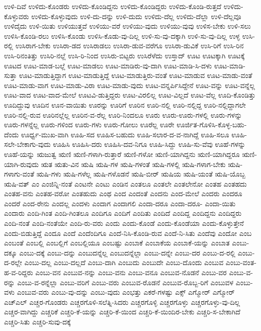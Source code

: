 {ಉಳಿ-ದಿವೆ
ಉಳಿದು-ಕೊಂಡರು
ಉಳಿದು-ಕೊಂಡಿದ್ದನು
ಉಳಿದು-ಕೊಂಡಿದ್ದರು
ಉಳಿದು-ಕೊಂಡಿ-ರುತ್ತದೆ
ಉಳಿದು-ಕೊಳ್ಳುವರು
ಉಳಿದು-ಕೊಳ್ಳುವುದು
ಉಳಿ-ದು-ದನ್ನು
ಉಳಿ-ದುದು
ಉಳಿದು-ದೆಲ್ಲ
ಉಳಿದು-ದೆಲ್ಲಾ
ಉಳಿ-ದೆಲ್ಲವೂ
ಉಳಿದೈದು
ಉಳಿ-ಯಿತು
ಉಳಿಯುತ್ತವೆ
ಉಳಿಯು-ವರೆ
ಉಳಿಯು-ವುದು
ಉಳಿಯು-ವುವು
ಉಳಿಸ-ಬೇಕು
ಉಳಿ-ಸಲು
ಉಳಿಸಿ-ಕೊಂಡಿ-ರಲು
ಉಳಿಸಿ-ಕೊಂಡು
ಉಳಿಸಿ-ಕೊಡು-ವು-ದಿಲ್ಲ
ಉಳಿ-ಸು-ವು-ದಕ್ಕಾಗಿ
ಉಳಿ-ಸು-ವು-ದಿಲ್ಲ
ಉಳ್ಳ
ಉಸಿ-ರಲ್ಲಿ
ಉಸಿರಾಗ-ಬೇಕು
ಉಸಿರಾ-ಡದ
ಉಸಿರಾಡಲು
ಉಸಿರಾ-ಡುವ-ವರೆಗೂ
ಉಸಿರಾ-ಡುವಿಕೆ
ಉಸಿ-ರಿಗೆ
ಉಸಿ-ರಿನ
ಉಸಿ-ರಿನಂತಿತ್ತು
ಉಸಿರಿ-ನಲ್ಲೆ
ಉಸಿ-ರಿ-ನಿಂದ
ಉಸಿರು-ಬಿಟ್ಟರು
ಉಸಿರೆಳೆದು
ಉಸ್ತಾದ್
ಊಟ
ಊಟಕ್ಕಾಗಿ
ಊಟಕ್ಕೆ
ಊಟದ
ಊಟ-ಮಾಡ-ಬಲ್ಲೆ
ಊಟ-ಮಾಡಲು
ಊಟ-ಮಾಡಿರು-ವು-ದಾಗಿ
ಊಟ-ಮಾಡಿ-ಸಿ-ದಳು
ಊಟ-ಮಾಡಿ-ಸುತ್ತಾ
ಊಟ-ಮಾಡುತ್ತಿದ್ದಾಗ
ಊಟ-ಮಾಡುತ್ತಿದ್ದೆ
ಊಟ-ಮಾಡುತ್ತಿರು-ವಂತೆ
ಊಟ-ಮಾಡುವ
ಊಟ-ಮಾಡು-ವಂತೆ
ಊಟ-ಮಾಡು-ವಾಗ
ಊಟ-ಮಾಡು-ವಿರಾ
ಊಟ-ಮಾಡು-ವುದು
ಊಟ-ವನ್ನರ್ಪಿಸಿದ್ದೇನೆ
ಊಟ-ವನ್ನು
ಊಟ-ವನ್ನೆಲ್ಲ
ಊಟ-ವಾದ
ಊಟ-ವಾದ-ಮೇಲೆ
ಊಟವಿ-ಡುತ್ತಿದ್ದರು
ಊಟ-ವಿರಲಿಲ್ಲ
ಊಟ-ವಿಲ್ಲದೆ
ಊಟ-ವೆಲ್ಲ
ಊದಿ-ಕೊಂಡಿತ್ತು
ಊದಿದ್ದುವು
ಊದಿನ
ಊನ-ವಾಯಿತು
ಊರನ್ನು
ಊರಿಗೆ
ಊರಿನ
ಊರಿ-ನಲ್ಲಿ
ಊರಿ-ನಲ್ಲಿದ್ದ
ಊರಿ-ನಲ್ಲಿದ್ದಾಗಲೇ
ಊರಿ-ನಲ್ಲಿ-ರುವ
ಊರಿನಲ್ಲೆಲ್ಲ
ಊರಿನ-ವ-ರೆಲ್ಲ
ಊರಿ-ನಿಂದಲೂ
ಊರು
ಊರು-ಊರು-ಗಳಲ್ಲಿ
ಊರು-ಗಳನ್ನು
ಊರು-ಗಳನ್ನೆಲ್ಲ
ಊರು-ಗಳಿಂದ
ಊರು-ಗಳು
ಊರು-ಗೋಲು
ಊರೆಲ್ಲ
ಊರೇ
ಊರ್ಜಿತ-ಗೊಳಿಸಿ-ಕೊಳ್ಳ-ಬಹು-ದೆಂದು
ಊರ್ಧ್ವ-ಮುಖ-ವಾಗಿ
ಊಹಿ-ಸದ
ಊಹಿಸ-ಬಹುದು
ಊಹಿ-ಸಲಾರ-ದ-ವ-ನಾಗಿದ್ದೆ
ಊಹಿ-ಸಲೂ
ಊಹಿ-ಸಲೇ-ಬೇಕಾಗು-ವುದು
ಊಹಿಸಿ
ಊಹಿಸಿ-ದರು
ಊಹಿಸಿ-ದವ-ನಿಗೂ
ಊಹಿ-ಸಿದ್ದು
ಊಹಿ-ಸು-ವೆವು
ಊಹೆ-ಗಳನ್ನು
ಊಹೆ-ಯನ್ನು
ಋಜುತ್ವ
ಋಣಿ
ಋಣಿ-ಗಳಾಗಿ-ರುತ್ತಾರೆ
ಋಣಿ-ಗಳೋ
ಋಣಿ-ಯಾಗಿದ್ದನು
ಋಣಿ-ಯಾಗಿದ್ದರೂ
ಋಣಿ-ಯಾಗಿ-ರುವುದು
ಋತ
ಋತು-ವಿನ
ಋಷಿ
ಋಷಿ-ಗಳ
ಋಷಿ-ಗಳಂತೆ
ಋಷಿ-ಗಳಲ್ಲಿ
ಋಷಿ-ಗಳಾಗ-ಬೇಕು
ಋಷಿ-ಗಳಾಗು-ವಂತೆ
ಋಷಿ-ಗಳು
ಋಷಿ-ಗಳೆಲ್ಲ
ಋಷಿ-ಗಳೊಡನೆ
ಋಷಿ-ಬೀರ್
ಋಷಿಯ
ಋಷಿ-ಯಂತೆ
ಋಷಿ-ಯೊಬ್ಬ
ಋಷಿ-ವತ್
ಎಂ
ಎಂಜಿನ್ನಿ-ನಂತೆ
ಎಂಟನೇ
ಎಂಟು
ಎಂಡಿನ
ಎಂತಲೂ
ಎಂತಲೇ
ಎಂತಲೇನೋ
ಎಂತಹ
ಎಂತಹದು
ಎಂತಹ-ವನು
ಎಂತಹ-ವರೋ
ಎಂತಹುದು
ಎಂಥ
ಎಂದ
ಎಂದಂತೆ
ಎಂದನು
ಎಂದ-ಮೇಲೆ
ಎಂದರು
ಎಂದರೂ
ಎಂದರೆ
ಎಂದ-ರೇನು
ಎಂದಲ್ಲ
ಎಂದಳು
ಎಂದಾಗ
ಎಂದಾಗಲಿ
ಎಂದಾ-ದರೂ
ಎಂದಾ-ದರೂ-
ಎಂದಾ-ಯಿತು
ಎಂದಾರು
ಎಂದಿ-ಗಿಂತ
ಎಂದಿ-ಗಿಂತಲೂ
ಎಂದಿಗೂ
ಎಂದಿಗೆ
ಎಂದಿತು
ಎಂದಿದೆ
ಎಂದಿದ್ದ
ಎಂದಿದ್ದನು
ಎಂದಿದ್ದರು
ಎಂದಿ-ನಂತೆ
ಎಂದಿ-ನಂತೆಯೇ
ಎಂದಿ-ರು-ವರು
ಎಂದು
ಎಂದು-ಕೊಂಡೆ
ಎಂದು-ಕೊಂಡೆಯಾ
ಎಂದು-ಕೊಳ್ಳುತ್ತೇನೆ
ಎಂದು-ಬಿಡುತ್ತಿದ್ದೆ
ಎಂದೂ
ಎಂದೆ
ಎಂದೆಂದಿಗೂ
ಎಂದೆ-ನಿಸಿ-ಕೊಂಡಿ-ರುವ
ಎಂದೆ-ನಿ-ಸಿತು
ಎಂದೆವು
ಎಂದೋ
ಎಂಬ
ಎಂಬಂತೆ
ಎಂಬಲ್ಲಿ
ಎಂಬಲ್ಲಿಗೆ
ಎಂಬಲ್ಲಿಯೂ
ಎಂಬಷ್ಟು
ಎಂಬಾಕೆ
ಎಂಬಾಕೆಯ
ಎಂಬಾಕೆ-ಯನ್ನು
ಎಂಬಾತ
ಎಂಬು-ದಕ್ಕೂ
ಎಂಬು-ದಕ್ಕೆ
ಎಂಬು-ದನ್ನು
ಎಂಬುದನ್ನೆಲ್ಲ
ಎಂಬುದನ್ನೆಲ್ಲಾ
ಎಂಬು-ದನ್ನೇ
ಎಂಬು-ದರ
ಎಂಬು-ದ-ರಲ್ಲಿ
ಎಂಬು-ದ-ರಲ್ಲೇ
ಎಂಬು-ದಲ್ಲ
ಎಂಬು-ದಲ್ಲದೆ
ಎಂಬು-ದಾಗಿ
ಎಂಬುದು
ಎಂಬುದೇ
ಎಂಬು-ದೊಂದು
ಎಂಬುವ
ಎಂಬು-ವಂತ-ಹ-ವ-ರಿದ್ದರು
ಎಂಬು-ವನ
ಎಂಬುವ-ನನ್ನು
ಎಂಬು-ವನು
ಎಂಬು-ವನೂ
ಎಂಬುವ-ನೊಡನೆ
ಎಂಬು-ವರ
ಎಂಬು-ವ-ರನ್ನು
ಎಂಬು-ವ-ರನ್ನೆಲ್ಲಾ
ಎಂಬು-ವರಿಗೆ
ಎಂಬು-ವರು
ಎಂಬುವ-ರೊಡನೆ
ಎಂಬುವ-ರೊಬ್ಬ-ರಿಗೆ
ಎಂಬುವಳ
ಎಂಬು-ವಳು
ಎಂಬುವ-ವರು
ಎಂಬು-ವು-ದನ್ನು
ಎಂಬು-ವುದು
ಎಂಭತ್ತು
ಎಕರೆ-ಗಳಷ್ಟು
ಎಕ್ಸ್
ಎಗ್ಮೋರ್
ಎಗ್ಮೋರ್
ಎಚ್ಎಲ್
ಎಚ್ಚರ-ಗೊಂಡರು
ಎಚ್ಚರಗೊಳಿ-ಸಲೆತ್ನಿ-ಸಿದರು
ಎಚ್ಚರಗೊಳ್ಳಿ
ಎಚ್ಚರಗೊಳ್ಳು
ಎಚ್ಚರಗೊಳ್ಳು-ವು-ದಿಲ್ಲ
ಎಚ್ಚರ-ವಾಗಿದ್ದು
ಎಚ್ಚರಿಕೆ
ಎಚ್ಚರಿ-ಕೆ-ಯನ್ನು
ಎಚ್ಚರಿ-ಕೆ-ಯಿಂದ
ಎಚ್ಚರಿ-ಕೆ-ಯಿಂದಿರ-ಬೇಕು
ಎಚ್ಚರಿ-ಸ-ಬೇಕಾಗಿದೆ
ಎಚ್ಚರಿ-ಸಿತು
ಎಚ್ಚರಿ-ಸುವು-ದಕ್ಕೆ
}
